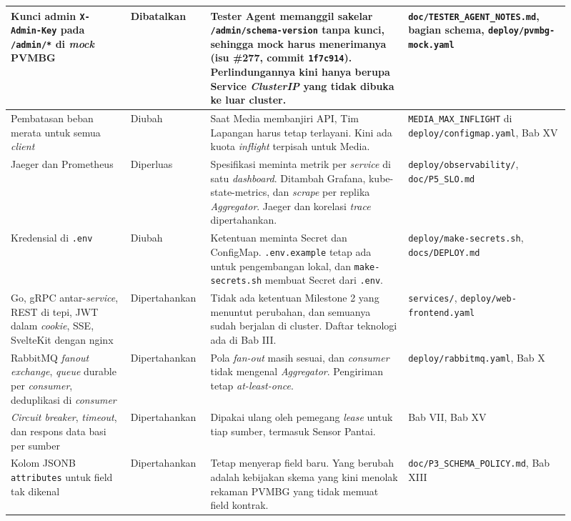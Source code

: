 \begin{longtable}[]{|>{\raggedright\arraybackslash}p{0.2\linewidth}|>{\raggedright\arraybackslash}p{0.11\linewidth}|>{\raggedright\arraybackslash}p{0.33\linewidth}|>{\raggedright\arraybackslash}p{0.27\linewidth}|}
\hline
Kunci admin \texttt{X-Admin-Key} pada \texttt{/admin/*} di \textit{mock} PVMBG & Dibatalkan & Tester Agent memanggil sakelar \texttt{/admin/schema-version} tanpa kunci, sehingga mock harus menerimanya (isu \#277, commit \texttt{1f7c914}). Perlindungannya kini hanya berupa Service \textit{ClusterIP} yang tidak dibuka ke luar cluster. & \texttt{doc/TESTER\_AGENT\_NOTES.md}, bagian schema, \texttt{deploy/pvmbg-mock.yaml} \\
\hline
Pembatasan beban merata untuk semua \textit{client} & Diubah & Saat Media membanjiri API, Tim Lapangan harus tetap terlayani. Kini ada kuota \textit{inflight} terpisah untuk Media. & \texttt{MEDIA\_MAX\_INFLIGHT} di \texttt{deploy/configmap.yaml}, Bab XV \\
\hline
Jaeger dan Prometheus & Diperluas & Spesifikasi meminta metrik per \textit{service} di satu \textit{dashboard}. Ditambah Grafana, kube-state-metrics, dan \textit{scrape} per replika \textit{Aggregator}. Jaeger dan korelasi \textit{trace} dipertahankan. & \texttt{deploy/observability/}, \texttt{doc/P5\_SLO.md} \\
\hline
Kredensial di \texttt{.env} & Diubah & Ketentuan meminta Secret dan ConfigMap. \texttt{.env.example} tetap ada untuk pengembangan lokal, dan \texttt{make-secrets.sh} membuat Secret dari \texttt{.env}. & \texttt{deploy/make-secrets.sh}, \texttt{docs/DEPLOY.md} \\
\hline
Go, gRPC antar-\textit{service}, REST di tepi, JWT dalam \textit{cookie}, SSE, SvelteKit dengan nginx & Dipertahankan & Tidak ada ketentuan Milestone 2 yang menuntut perubahan, dan semuanya sudah berjalan di cluster. Daftar teknologi ada di Bab III. & \texttt{services/}, \texttt{deploy/web-frontend.yaml} \\
\hline
RabbitMQ \textit{fanout exchange}, \textit{queue} durable per \textit{consumer}, deduplikasi di \textit{consumer} & Dipertahankan & Pola \textit{fan-out} masih sesuai, dan \textit{consumer} tidak mengenal \textit{Aggregator}. Pengiriman tetap \textit{at-least-once}. & \texttt{deploy/rabbitmq.yaml}, Bab X \\
\hline
\textit{Circuit breaker}, \textit{timeout}, dan respons data basi per sumber & Dipertahankan & Dipakai ulang oleh pemegang \textit{lease} untuk tiap sumber, termasuk Sensor Pantai. & Bab VII, Bab XV \\
\hline
Kolom JSONB \texttt{attributes} untuk field tak dikenal & Dipertahankan & Tetap menyerap field baru. Yang berubah adalah kebijakan skema yang kini menolak rekaman PVMBG yang tidak memuat field kontrak. & \texttt{doc/P3\_SCHEMA\_POLICY.md}, Bab XIII \\

\end{longtable}
